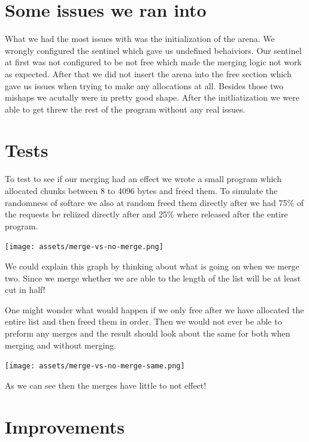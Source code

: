 \documentclass{article}
\begin{document}
\section{Some issues we ran into}

What we had the most issues with was the initialization of the arena. We wrongly configured the sentinel which gave us undefined behaiviors. Our sentinel at first was not configured to be not free which made the merging logic not work as expected. After that we did not insert the arena into the free section which gave us issues when trying to make any allocations at all. Besides those two mishaps we acutally were in pretty good shape. After the initliatization we were able to get threw the rest of the program without any real issues.



\section{Tests}

To test to see if our merging had an effect we wrote a small program which allocated chunks between 8 to 4096 bytes and freed them. To simulate the randomness of softare we also at random freed them directly after we had 75\% of the requests be reliized directly after and 25\% where released after the entire program.

\begin{center}
    \texttt{[image: assets/merge-vs-no-merge.png]}
\end{center}

We could explain this graph by thinking about what is going on when we merge two. Since we merge whether we are able to the length of the list will be at least cut in half!

One might wonder what would happen if we only free after we have allocated the entire list and then freed them in order. Then we would not ever be able to preform any merges and the result should look about the same for both when merging and without merging.

\begin{center}
    \texttt{[image: assets/merge-vs-no-merge-same.png]}
\end{center}

As we can see then the merges have little to not effect!

\section{Improvements}
\end{document}
